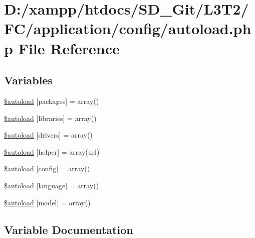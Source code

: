 \hypertarget{application_2config_2autoload_8php}{}\section{D\+:/xampp/htdocs/\+S\+D\+\_\+\+Git/\+L3\+T2/\+F\+C/application/config/autoload.php File Reference}
\label{application_2config_2autoload_8php}
\subsection*{Variables}
\begin{DoxyCompactItemize}
\item 
\hyperlink{application_2config_2autoload_8php_ab562c5bbb18f14d6b6b7014d9166625d}{\$autoload} \mbox{[}\textquotesingle{}packages\textquotesingle{}\mbox{]} = array()
\item 
\hyperlink{application_2config_2autoload_8php_ab86d0a1a62e12b528eacaa7100bc4d93}{\$autoload} \mbox{[}\textquotesingle{}libraries\textquotesingle{}\mbox{]} = array()
\item 
\hyperlink{application_2config_2autoload_8php_ab5159fd0a997ccee7145f373cdab896f}{\$autoload} \mbox{[}\textquotesingle{}drivers\textquotesingle{}\mbox{]} = array()
\item 
\hyperlink{application_2config_2autoload_8php_aa98014ce8ad854ad9500e65ff159272d}{\$autoload} \mbox{[}\textquotesingle{}helper\textquotesingle{}\mbox{]} = array(\textquotesingle{}url\textquotesingle{})
\item 
\hyperlink{application_2config_2autoload_8php_ac051887e192979c0320e05821bad8f33}{\$autoload} \mbox{[}\textquotesingle{}config\textquotesingle{}\mbox{]} = array()
\item 
\hyperlink{application_2config_2autoload_8php_addfee4f4b38a8235172cb173995a9c0b}{\$autoload} \mbox{[}\textquotesingle{}language\textquotesingle{}\mbox{]} = array()
\item 
\hyperlink{application_2config_2autoload_8php_a942b884082b1defda7fb10ee71bba324}{\$autoload} \mbox{[}\textquotesingle{}model\textquotesingle{}\mbox{]} = array()
\end{DoxyCompactItemize}


\subsection{Variable Documentation}
\hypertarget{application_2config_2autoload_8php_ab562c5bbb18f14d6b6b7014d9166625d}{}
